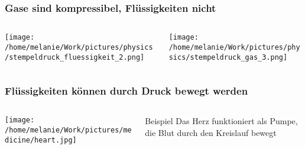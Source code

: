 \documentclass{beamer}
\begin{document}
\begin{frame}
\frametitle{Gase sind kompressibel, Flüssigkeiten nicht}

\begin{columns}[c]

\begin{column}{5cm}
\begin{center}
\texttt{[image: /home/melanie/Work/pictures/physics/stempeldruck\_fluessigkeit\_2.png]}
\end{center}
\end{column}

\begin{column}{5cm}
\begin{center}
\texttt{[image: /home/melanie/Work/pictures/physics/stempeldruck\_gas\_3.png]}
\end{center}
\end{column}

\end{columns}


\end{frame}


\begin{frame}
\frametitle{Flüssigkeiten können durch Druck bewegt werden}

\begin{columns}[c]

\begin{column}{5cm}
\begin{center}
\texttt{[image: /home/melanie/Work/pictures/medicine/heart.jpg]}
\end{center}
\end{column}

\begin{column}{5cm}
\begin{block}{Beispiel}
Das Herz funktioniert als Pumpe, die Blut durch den Kreislauf bewegt
\end{block}
\end{column}

\end{columns}


\end{frame}



\begin{frame}
\end{frame}
\end{document}
